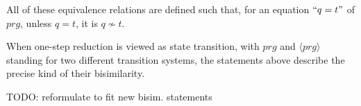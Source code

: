 \documentclass[11pt]{article} %
\begin{document}
All of these equivalence relations are defined such that, for an equation $`` q = t "$ of $prg$, unless $q = t$, it is $q \not\sim t$.

%
%
%
%

When one-step reduction is viewed as state transition, with $prg$ and $\langle prg \rangle$ standing for two different transition systems, the statements above describe the precise kind of their bisimilarity.

TODO: reformulate to fit new bisim. statements

%
%
\end{document}
